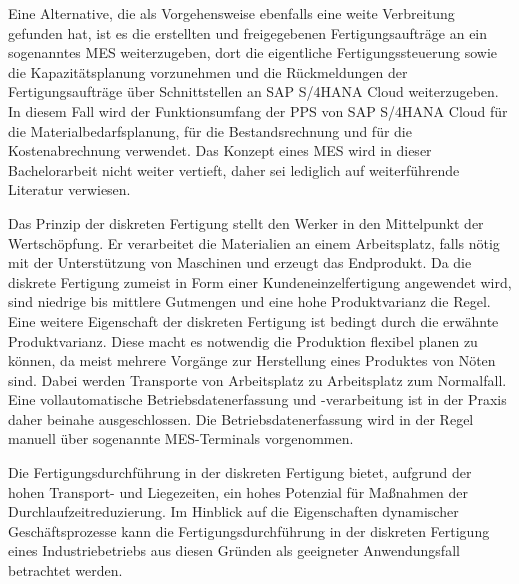 Eine Alternative, die als Vorgehensweise ebenfalls eine weite Verbreitung gefunden hat, ist es die erstellten und freigegebenen Fertigungsaufträge an ein sogenanntes \ac{MES} weiterzugeben, dort die eigentliche Fertigungssteuerung sowie die Kapazitätsplanung vorzunehmen und die Rückmeldungen der Fertigungsaufträge über Schnittstellen an SAP S/4HANA Cloud weiterzugeben. 
\cite{Gerberich.2011}
In diesem Fall wird der Funktionsumfang der \ac{PPS} von SAP S/4HANA Cloud  für die Materialbedarfsplanung, für die Bestandsrechnung und für die Kostenabrechnung verwendet.
\cite{Dickersbach.2014}
Das Konzept eines \ac{MES} wird in dieser Bachelorarbeit nicht weiter vertieft, daher sei lediglich auf weiterführende Literatur verwiesen.
\cite{Kletti.2007} \cite{Gerberich.2011}


Das Prinzip der diskreten Fertigung stellt den Werker in den Mittelpunkt der Wertschöpfung. 
Er verarbeitet die Materialien an einem Arbeitsplatz, falls nötig mit der Unterstützung von Maschinen und erzeugt das Endprodukt. 
\cite{Gerberich.2011}
Da die diskrete Fertigung zumeist in Form einer Kundeneinzelfertigung angewendet wird, sind niedrige bis mittlere Gutmengen und eine hohe Produktvarianz die Regel. 
Eine weitere Eigenschaft der diskreten Fertigung ist bedingt durch die erwähnte Produktvarianz. Diese macht es notwendig die Produktion flexibel planen zu können, da meist mehrere Vorgänge zur Herstellung eines Produktes von Nöten sind.
Dabei werden Transporte von Arbeitsplatz zu Arbeitsplatz zum Normalfall.
Eine vollautomatische Betriebsdatenerfassung und -verarbeitung ist in der Praxis daher beinahe ausgeschlossen.
Die Betriebsdatenerfassung wird in der Regel manuell über sogenannte \ac{MES}-Terminals vorgenommen.
\cite{Gerberich.2011}

Die Fertigungsdurchführung in der diskreten Fertigung bietet, aufgrund der hohen Transport- und Liegezeiten, ein hohes Potenzial für Maßnahmen der Durchlaufzeitreduzierung.
Im Hinblick auf die Eigenschaften dynamischer Geschäftsprozesse kann die Fertigungsdurchführung in der diskreten Fertigung eines Industriebetriebs aus diesen Gründen als geeigneter Anwendungsfall betrachtet werden.  

